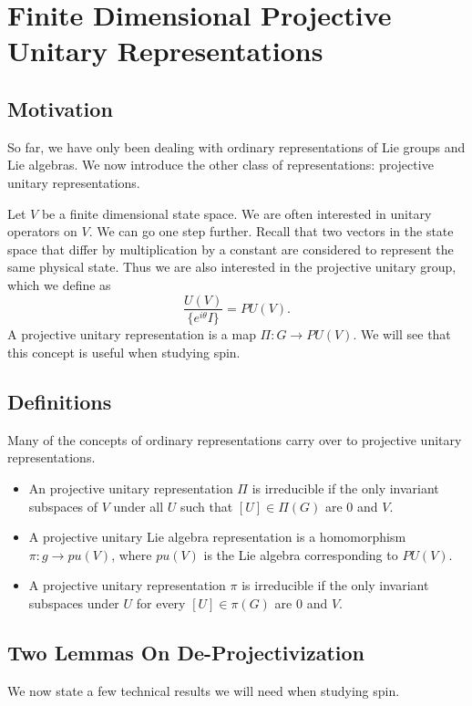 \section{Finite Dimensional Projective Unitary Representations}
\subsection{Motivation}
So far, we have only been dealing with ordinary representations of Lie groups and Lie algebras. We now introduce the other class of representations: projective unitary representations.

Let $V$ be a finite dimensional state space. We are often interested in unitary operators on $V$. We can go one step further. Recall that two vectors in the state space that differ by multiplication by a constant are considered to represent the same physical state. Thus we are also interested in the projective unitary group, which we define as
\[
    \frac{U(V)}{\{e^{i\theta}I\}} = PU(V).
\]
A projective unitary representation is a map $\Pi: G \rightarrow PU(V)$. We will see that this concept is useful when studying spin.

\subsection{Definitions}
Many of the concepts of ordinary representations carry over to projective unitary representations.
\begin{itemize}
    \item An projective unitary representation $\Pi$ is irreducible if the only invariant subspaces of $V$ under all $U$ such that $[U] \in \Pi(G)$ are $0$ and $V$.
    \item A projective unitary Lie algebra representation is a homomorphism $\mathfrak\pi: g \rightarrow pu(V)$, where $pu(V)$ is the Lie algebra corresponding to $PU(V)$.
    \item A projective unitary representation $\pi$ is irreducible if the only invariant subspaces under $U$ for every $[U] \in \pi(G)$ are $0$ and $V$.
\end{itemize}

\subsection{Two Lemmas On De-Projectivization}
We now state a few technical results we will need when studying spin.


